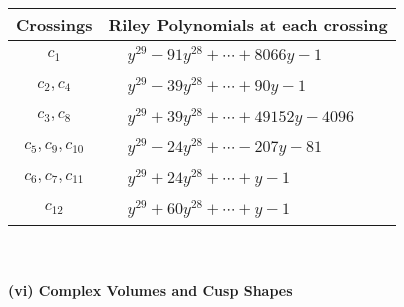 \documentclass[1p]{elsarticle_modified}
\theoremstyle{definition}
\begin{document}
\begin{tabular}{m{50pt}|m{274pt}}
Crossings & \hspace{64pt}Riley Polynomials at each crossing \\
\hline $$\begin{aligned}c_{1}\end{aligned}$$&$\begin{aligned}
&y^{29}-91 y^{28}+\cdots+8066 y-1
\end{aligned}$\\
\hline $$\begin{aligned}c_{2},c_{4}\end{aligned}$$&$\begin{aligned}
&y^{29}-39 y^{28}+\cdots+90 y-1
\end{aligned}$\\
\hline $$\begin{aligned}c_{3},c_{8}\end{aligned}$$&$\begin{aligned}
&y^{29}+39 y^{28}+\cdots+49152 y-4096
\end{aligned}$\\
\hline $$\begin{aligned}c_{5},c_{9},c_{10}\end{aligned}$$&$\begin{aligned}
&y^{29}-24 y^{28}+\cdots-207 y-81
\end{aligned}$\\
\hline $$\begin{aligned}c_{6},c_{7},c_{11}\end{aligned}$$&$\begin{aligned}
&y^{29}+24 y^{28}+\cdots+y-1
\end{aligned}$\\
\hline $$\begin{aligned}c_{12}\end{aligned}$$&$\begin{aligned}
&y^{29}+60 y^{28}+\cdots+y-1
\end{aligned}$\\
\hline
\end{tabular}\\~\\
\newpage\flushleft \textbf{(vi) Complex Volumes and Cusp Shapes}
\end{document}

